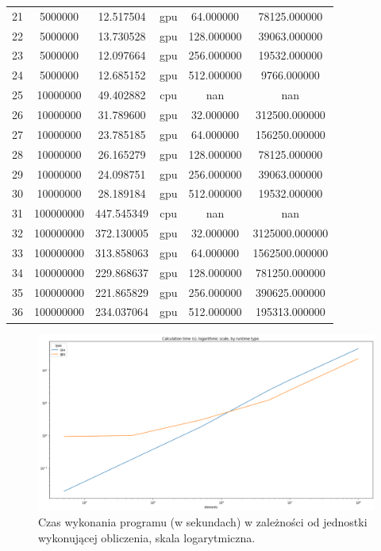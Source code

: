 \documentclass{article}
\begin{document}
\begin{center}
\begin{tabular}{|c|c|c|c|c|c|}
            21 & 5000000 & 12.517504 & gpu & 64.000000 & 78125.000000 \\
            22 & 5000000 & 13.730528 & gpu & 128.000000 & 39063.000000 \\
            23 & 5000000 & 12.097664 & gpu & 256.000000 & 19532.000000 \\
            24 & 5000000 & 12.685152 & gpu & 512.000000 & 9766.000000 \\
            25 & 10000000 & 49.402882 & cpu & nan & nan \\
            26 & 10000000 & 31.789600 & gpu & 32.000000 & 312500.000000 \\
            27 & 10000000 & 23.785185 & gpu & 64.000000 & 156250.000000 \\
            28 & 10000000 & 26.165279 & gpu & 128.000000 & 78125.000000 \\
            29 & 10000000 & 24.098751 & gpu & 256.000000 & 39063.000000 \\
            30 & 10000000 & 28.189184 & gpu & 512.000000 & 19532.000000 \\
            31 & 100000000 & 447.545349 & cpu & nan & nan \\
            32 & 100000000 & 372.130005 & gpu & 32.000000 & 3125000.000000 \\
            33 & 100000000 & 313.858063 & gpu & 64.000000 & 1562500.000000 \\
            34 & 100000000 & 229.868637 & gpu & 128.000000 & 781250.000000 \\
            35 & 100000000 & 221.865829 & gpu & 256.000000 & 390625.000000 \\
            36 & 100000000 & 234.037064 & gpu & 512.000000 & 195313.000000 \\
            \hline
            \end{tabular}
        \end{center}
        
        \begin{figure}[htb]
            \centering
            \includegraphics[width=\textwidth]{images/time_by_type.png}
            \caption{Czas wykonania programu (w sekundach) w zależności od jednostki wykonującej obliczenia, skala logarytmiczna.}
        \end{figure}
        
\end{document}
